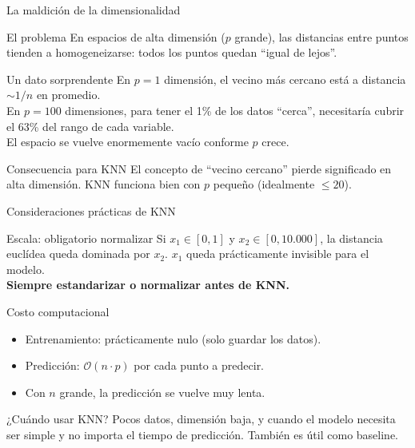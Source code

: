 \documentclass[aspectratio=169]{beamer}
\begin{document}
\begin{frame}{La maldición de la dimensionalidad}
  \begin{block}{El problema}
    En espacios de alta dimensión ($p$ grande), las distancias entre puntos
    tienden a homogeneizarse: todos los puntos quedan ``igual de lejos''.
  \end{block}

  \medskip
  \begin{exampleblock}{Un dato sorprendente}
    En $p = 1$ dimensión, el vecino más cercano está a distancia $\sim 1/n$ en promedio.\\
    En $p = 100$ dimensiones, para tener el 1\% de los datos ``cerca'',
    necesitaría cubrir el 63\% del rango de cada variable.\\[4pt]
    El espacio se vuelve enormemente vacío conforme $p$ crece.
  \end{exampleblock}

  \medskip
  \begin{alertblock}{Consecuencia para KNN}
    El concepto de ``vecino cercano'' pierde significado en alta dimensión.
    KNN funciona bien con $p$ pequeño (idealmente $\leq 20$).
  \end{alertblock}
\end{frame}

\begin{frame}{Consideraciones prácticas de KNN}
  \begin{alertblock}{Escala: obligatorio normalizar}
    Si $x_1 \in [0, 1]$ y $x_2 \in [0, 10{.}000]$,
    la distancia euclídea queda dominada por $x_2$.
    $x_1$ queda prácticamente invisible para el modelo.\\
    \textbf{Siempre estandarizar o normalizar antes de KNN.}
  \end{alertblock}

  \medskip
  \begin{block}{Costo computacional}
    \begin{itemize}
      \item Entrenamiento: prácticamente nulo (solo guardar los datos).
      \item Predicción: $\mathcal{O}(n \cdot p)$ por cada punto a predecir.
      \item Con $n$ grande, la predicción se vuelve muy lenta.
    \end{itemize}
  \end{block}

  \medskip
  \begin{exampleblock}{¿Cuándo usar KNN?}
    Pocos datos, dimensión baja, y cuando el modelo necesita ser simple
    y no importa el tiempo de predicción. También es útil como baseline.
  \end{exampleblock}
\end{frame}
\end{document}
